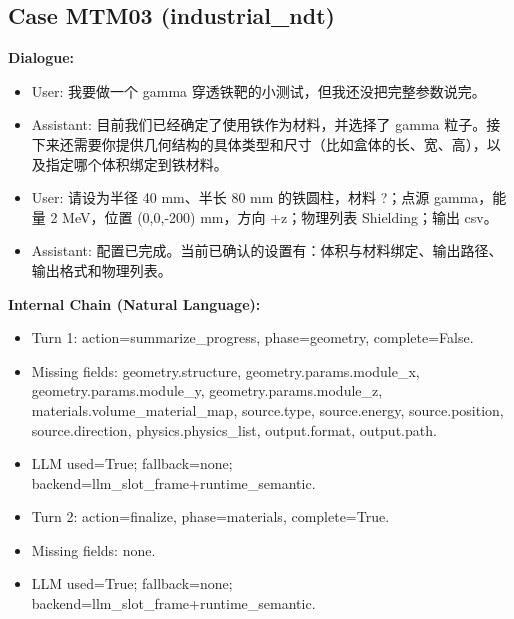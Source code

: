 \documentclass[11pt]{ctexart}
\begin{document}
\subsection{Case MTM03 (industrial\_ndt)}
\textbf{Dialogue:}
\begin{itemize}
\item User: 我要做一个 gamma 穿透铁靶的小测试，但我还没把完整参数说完。
\item Assistant: 目前我们已经确定了使用铁作为材料，并选择了 gamma 粒子。接下来还需要你提供几何结构的具体类型和尺寸（比如盒体的长、宽、高），以及指定哪个体积绑定到铁材料。
\item User: 请设为半径 40 mm、半长 80 mm 的铁圆柱，材料 ?；点源 gamma，能量 2 MeV，位置 (0,0,-200) mm，方向 +z；物理列表 Shielding；输出 csv。
\item Assistant: 配置已完成。当前已确认的设置有：体积与材料绑定、输出路径、输出格式和物理列表。
\end{itemize}
\textbf{Internal Chain (Natural Language):}
\begin{itemize}
\item Turn 1: action=summarize\_progress, phase=geometry, complete=False.
\item Missing fields: geometry.structure, geometry.params.module\_x, geometry.params.module\_y, geometry.params.module\_z, materials.volume\_material\_map, source.type, source.energy, source.position, source.direction, physics.physics\_list, output.format, output.path.
\item LLM used=True; fallback=none; backend=llm\_slot\_frame+runtime\_semantic.
\item Turn 2: action=finalize, phase=materials, complete=True.
\item Missing fields: none.
\item LLM used=True; fallback=none; backend=llm\_slot\_frame+runtime\_semantic.
\end{itemize}
\end{document}
